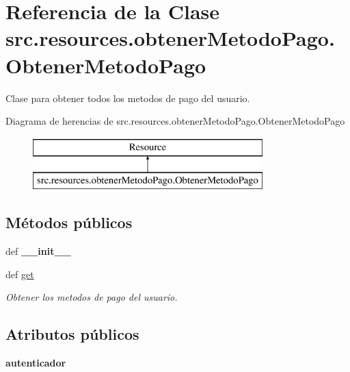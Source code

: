 \hypertarget{classsrc_1_1resources_1_1obtener_metodo_pago_1_1_obtener_metodo_pago}{\section{Referencia de la Clase src.\-resources.\-obtener\-Metodo\-Pago.\-Obtener\-Metodo\-Pago}
\label{classsrc_1_1resources_1_1obtener_metodo_pago_1_1_obtener_metodo_pago}
}


Clase para obtener todos los metodos de pago del usuario.  


Diagrama de herencias de src.\-resources.\-obtener\-Metodo\-Pago.\-Obtener\-Metodo\-Pago\begin{figure}[H]
\begin{center}
\leavevmode
\includegraphics[height=2.000000cm]{classsrc_1_1resources_1_1obtener_metodo_pago_1_1_obtener_metodo_pago}
\end{center}
\end{figure}
\subsection*{Métodos públicos}
\begin{DoxyCompactItemize}
\item 
\hypertarget{classsrc_1_1resources_1_1obtener_metodo_pago_1_1_obtener_metodo_pago_a68555f5e8e8c1f68a0f8737eb5db4e7a}{def {\bfseries \-\_\-\-\_\-init\-\_\-\-\_\-}}\label{classsrc_1_1resources_1_1obtener_metodo_pago_1_1_obtener_metodo_pago_a68555f5e8e8c1f68a0f8737eb5db4e7a}

\item 
def \hyperlink{classsrc_1_1resources_1_1obtener_metodo_pago_1_1_obtener_metodo_pago_a814676b841d4ba6555293706c1215425}{get}
\begin{DoxyCompactList}\small\item\em Obtener los metodos de pago del usuario. \end{DoxyCompactList}\end{DoxyCompactItemize}
\subsection*{Atributos públicos}
\begin{DoxyCompactItemize}
\item 
\hypertarget{classsrc_1_1resources_1_1obtener_metodo_pago_1_1_obtener_metodo_pago_a1ccb91ad95fc19258cc3f247625d96d3}{{\bfseries autenticador}}\label{classsrc_1_1resources_1_1obtener_metodo_pago_1_1_obtener_metodo_pago_a1ccb91ad95fc19258cc3f247625d96d3}

\end{DoxyCompactItemize}

